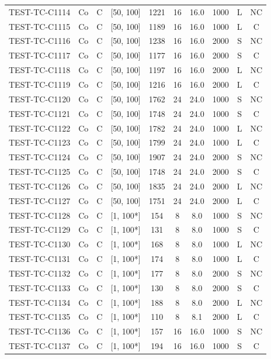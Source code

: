 \begin{longtable}{lccccccccc}
TEST-TC-C1114 & Co & C & [50, 100] & 1221 & 16 & 16.0 & 1000 & L & NC \\
TEST-TC-C1115 & Co & C & [50, 100] & 1189 & 16 & 16.0 & 1000 & L & C \\
TEST-TC-C1116 & Co & C & [50, 100] & 1238 & 16 & 16.0 & 2000 & S & NC \\
TEST-TC-C1117 & Co & C & [50, 100] & 1177 & 16 & 16.0 & 2000 & S & C \\
TEST-TC-C1118 & Co & C & [50, 100] & 1197 & 16 & 16.0 & 2000 & L & NC \\
TEST-TC-C1119 & Co & C & [50, 100] & 1216 & 16 & 16.0 & 2000 & L & C \\
TEST-TC-C1120 & Co & C & [50, 100] & 1762 & 24 & 24.0 & 1000 & S & NC \\
TEST-TC-C1121 & Co & C & [50, 100] & 1748 & 24 & 24.0 & 1000 & S & C \\
TEST-TC-C1122 & Co & C & [50, 100] & 1782 & 24 & 24.0 & 1000 & L & NC \\
TEST-TC-C1123 & Co & C & [50, 100] & 1799 & 24 & 24.0 & 1000 & L & C \\
TEST-TC-C1124 & Co & C & [50, 100] & 1907 & 24 & 24.0 & 2000 & S & NC \\
TEST-TC-C1125 & Co & C & [50, 100] & 1748 & 24 & 24.0 & 2000 & S & C \\
TEST-TC-C1126 & Co & C & [50, 100] & 1835 & 24 & 24.0 & 2000 & L & NC \\
TEST-TC-C1127 & Co & C & [50, 100] & 1751 & 24 & 24.0 & 2000 & L & C \\
TEST-TC-C1128 & Co & C & [1, 100*] & 154 & 8 & 8.0 & 1000 & S & NC \\
TEST-TC-C1129 & Co & C & [1, 100*] & 131 & 8 & 8.0 & 1000 & S & C \\
TEST-TC-C1130 & Co & C & [1, 100*] & 168 & 8 & 8.0 & 1000 & L & NC \\
TEST-TC-C1131 & Co & C & [1, 100*] & 174 & 8 & 8.0 & 1000 & L & C \\
TEST-TC-C1132 & Co & C & [1, 100*] & 177 & 8 & 8.0 & 2000 & S & NC \\
TEST-TC-C1133 & Co & C & [1, 100*] & 130 & 8 & 8.0 & 2000 & S & C \\
TEST-TC-C1134 & Co & C & [1, 100*] & 188 & 8 & 8.0 & 2000 & L & NC \\
TEST-TC-C1135 & Co & C & [1, 100*] & 110 & 8 & 8.1 & 2000 & L & C \\
TEST-TC-C1136 & Co & C & [1, 100*] & 157 & 16 & 16.0 & 1000 & S & NC \\
TEST-TC-C1137 & Co & C & [1, 100*] & 194 & 16 & 16.0 & 1000 & S & C \\

\end{longtable}
